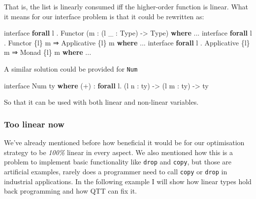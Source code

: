 \documentclass[
]{article}
\newenvironment{Shaded}{}{}
\newcommand{\DataTypeTok}[1]{\textcolor[rgb]{0.56,0.13,0.00}{#1}}
\newcommand{\KeywordTok}[1]{\textcolor[rgb]{0.00,0.44,0.13}{\textbf{#1}}}
\newcommand{\NormalTok}[1]{#1}
\newcommand{\OperatorTok}[1]{\textcolor[rgb]{0.40,0.40,0.40}{#1}}
\newcommand{\OtherTok}[1]{\textcolor[rgb]{0.00,0.44,0.13}{#1}}
\begin{document}
That is, the list is linearly consumed iff the higher-order function is
linear. What it means for our interface problem is that it could be
rewritten as:

\begin{Shaded}
\begin{Highlighting}[]
\NormalTok{interface }\KeywordTok{forall}\NormalTok{ l }\OperatorTok{.} \DataTypeTok{Functor}\NormalTok{ (m }\OperatorTok{:}\NormalTok{ (l \_ }\OperatorTok{:} \DataTypeTok{Type}\NormalTok{) }\OtherTok{{-}\textgreater{}} \DataTypeTok{Type}\NormalTok{) }\KeywordTok{where}
    \OperatorTok{...}
\NormalTok{interface }\KeywordTok{forall}\NormalTok{ l }\OperatorTok{.} \DataTypeTok{Functor}\NormalTok{ \{l\} m }\OtherTok{⇒} \DataTypeTok{Applicative}\NormalTok{ \{l\} m }\KeywordTok{where}
    \OperatorTok{...}
\NormalTok{interface }\KeywordTok{forall}\NormalTok{ l }\OperatorTok{.} \DataTypeTok{Applicative}\NormalTok{ \{l\} m }\OtherTok{⇒} \DataTypeTok{Monad}\NormalTok{ \{l\} m }\KeywordTok{where}
    \OperatorTok{...}
\end{Highlighting}
\end{Shaded}

A similar solution could be provided for \texttt{Num}

\begin{Shaded}
\begin{Highlighting}[]
\NormalTok{interface }\DataTypeTok{Num}\NormalTok{ ty }\KeywordTok{where}
\NormalTok{    (}\OperatorTok{+}\NormalTok{) }\OperatorTok{:} \KeywordTok{forall}\NormalTok{ l}\OperatorTok{.}\NormalTok{ (l n }\OperatorTok{:}\NormalTok{ ty) }\OtherTok{{-}\textgreater{}}\NormalTok{ (l m }\OperatorTok{:}\NormalTok{ ty) }\OtherTok{{-}\textgreater{}}\NormalTok{ ty}
\end{Highlighting}
\end{Shaded}

So that it can be used with both linear and non-linear variables.

\hypertarget{too-linear-now}{%
\subsubsection{Too linear now}\label{too-linear-now}}

We've already mentioned before how beneficial it would be for our
optimisation strategy to be \emph{100\%} linear in every aspect. We also
mentioned how this is a problem to implement basic functionality like
\texttt{drop} and \texttt{copy}, but those are artificial examples,
rarely does a programmer need to call \texttt{copy} or \texttt{drop} in
industrial applications. In the following example I will show how linear
types hold back programming and how QTT can fix it.
\end{document}
